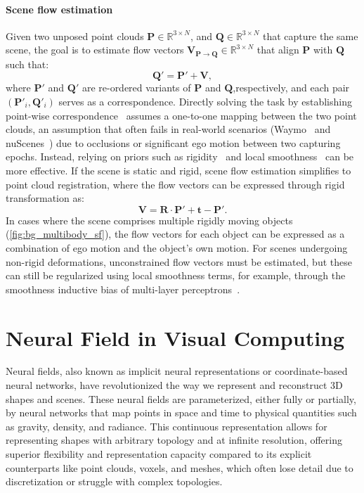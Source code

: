 \paragraph{Scene flow estimation}
Given two unposed point clouds $\mathbf{P} \in \mathbb{R}^{3 \times N} $, and $\mathbf{Q} \in \mathbb{R}^{3 \times N}$ that capture the same scene, the goal is to estimate flow vectors $\mathbf{V}_{\mathbf{P} \rightarrow \mathbf{Q}} \in \mathbb{R}^{3 \times N}$ that align $\mathbf{P}$ with $\mathbf{Q}$ such that:
\begin{equation}
    \mathbf{Q}' = \mathbf{P}' + \mathbf{V},
\end{equation}
where $\mathbf{P}'$ and $\mathbf{Q}'$ are re-ordered variants of $\mathbf{P}$ and $\mathbf{Q}$,respectively, and each pair $(\mathbf{P}'_i, \mathbf{Q}'_i)$ serves as a correspondence. Directly solving the task by establishing point-wise correspondence~\cite{wu2019pointpwc} assumes a one-to-one mapping between the two point clouds, an assumption that often fails in real-world scenarios (\eg Waymo~\cite{sun2020scalability} and nuScenes~\cite{caesar2020nuscenes}) due to occlusions or significant ego motion between two capturing epochs. Instead, relying on priors such as rigidity~\cite{gojcic2021weakly} and local smoothness~\cite{li2020neural} can be more effective. If the scene is static and rigid, scene flow estimation simplifies to point cloud registration, where the flow vectors can be expressed through rigid transformation as:
\begin{equation}
    \mathbf{V} = \mathbf{R}\cdot \mathbf{P}' + \mathbf{t} - \mathbf{P}'.
\end{equation}
In cases where the scene comprises multiple rigidly moving objects (\cf \cref{fig:bg_multibody_sf}), the flow vectors for each object can be expressed as a combination of ego motion and the object's own motion. For scenes undergoing non-rigid deformations, unconstrained flow vectors must be estimated, but these can still be regularized using local smoothness terms, for example, through the smoothness inductive bias of multi-layer perceptrons~\cite{li2020neural,li2023fast}.


\section{Neural Field in Visual Computing}
\label{sec:bg_neural_field}
Neural fields, also known as implicit neural representations or coordinate-based neural networks, have revolutionized the way we represent and reconstruct 3D shapes and scenes. These neural fields are parameterized, either fully or partially, by neural networks that map points in space and time to physical quantities such as gravity, density, and radiance. This continuous representation allows for representing shapes with arbitrary topology and at infinite resolution, offering superior flexibility and representation capacity compared to its explicit counterparts like point clouds, voxels, and meshes, which often lose detail due to discretization or struggle with complex topologies.

